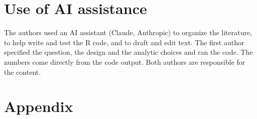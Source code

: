\documentclass[11pt,letterpaper]{article}
\begin{document}
\section*{Use of AI assistance}

The authors used an AI assistant (Claude, Anthropic) to organize the literature, to help write and test the R code, and to draft and edit text. The first author specified the question, the design and the analytic choices and ran the code. The numbers come directly from the code output. Both authors are responsible for the content.



\appendix
\section*{Appendix}
\begin{table}[htbp]\centering\caption*{\textbf{Table A1.} \emph{Analysis variables: how each is stored, its levels and missing values.}}\end{table}
\begin{table}[htbp]\centering\caption*{\textbf{Table A2.} \emph{Complete-case births compared with births dropped for missing confounders.}}\end{table}
\begin{table}[htbp]\centering\caption*{\textbf{Table A3.} \emph{Variance check.}}\end{table}
\begin{table}[htbp]\centering\caption*{\textbf{Table A4.} \emph{Calibration of cross-fitted learners: predicted against observed.}}\resizebox{\textwidth}{!}{}\end{table}
\begin{table}[htbp]\centering\caption*{\textbf{Table A5.} \emph{Smoking history, exploratory.}}\resizebox{\textwidth}{!}{}\end{table}
\begin{table}[htbp]\centering\caption*{\textbf{Table A6.} \emph{Measured covariates as benchmarks for the E-value.}}\resizebox{\textwidth}{!}{}\end{table}
\begin{table}[htbp]\centering\caption*{\textbf{Table A7.} \emph{Trimester of smoking and third-trimester intensity, exploratory (full 2023 natality file).}}\resizebox{\textwidth}{!}{}\end{table}
\end{document}
